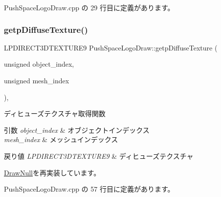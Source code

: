  Push\+Space\+Logo\+Draw.\+cpp の 29 行目に定義があります。

\mbox{\label{class_push_space_logo_draw_a0b4de9ad688997090ab6ab4925e1f5d8}} 
\subsubsection{\texorpdfstring{getp\+Diffuse\+Texture()}{getpDiffuseTexture()}}
{\footnotesize\ttfamily L\+P\+D\+I\+R\+E\+C\+T3\+D\+T\+E\+X\+T\+U\+R\+E9 Push\+Space\+Logo\+Draw\+::getp\+Diffuse\+Texture (\begin{DoxyParamCaption}\item[{unsigned}]{object\+\_\+index,  }\item[{unsigned}]{mesh\+\_\+index }\end{DoxyParamCaption})\hspace{0.3cm}{\ttfamily [override]}, {\ttfamily [virtual]}}



ディヒューズテクスチャ取得関数 


\begin{DoxyParams}{引数}
{\em object\+\_\+index} & オブジェクトインデックス \\
\hline
{\em mesh\+\_\+index} & メッシュインデックス \\
\hline
\end{DoxyParams}

\begin{DoxyRetVals}{戻り値}
{\em L\+P\+D\+I\+R\+E\+C\+T3\+D\+T\+E\+X\+T\+U\+R\+E9} & ディヒューズテクスチャ \\
\hline
\end{DoxyRetVals}


\mbox{\hyperlink{class_draw_null_a98cc7cd43b19d9d70cc621d23d89286f}{Draw\+Null}}を再実装しています。



 Push\+Space\+Logo\+Draw.\+cpp の 57 行目に定義があります。

\mbox{\label{class_push_space_logo_draw_a4dc41e6b1afece431f3c321145abe541}} 
